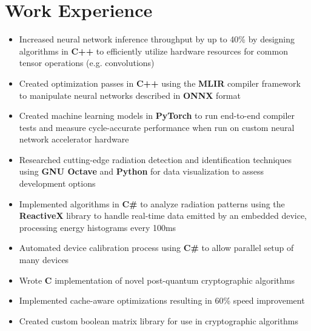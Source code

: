 \documentclass{moderncv}
\begin{document}
\makecvtitle
\section{Work Experience}
{\begin{itemize}
    \item Increased neural network inference throughput by up to 40\% by designing algorithms in \textbf{C++} to efficiently utilize hardware resources for common tensor operations (e.g. convolutions)
    \item Created optimization passes in \textbf{C++} using the \textbf{MLIR} compiler framework to manipulate neural networks described in \textbf{ONNX} format
    \item Created machine learning models in \textbf{PyTorch} to run end-to-end compiler tests and measure cycle-accurate performance when run on custom neural network accelerator hardware
\end{itemize}}

{\begin{itemize}
    \item Researched cutting-edge radiation detection and identification techniques using \textbf{GNU Octave} and \textbf{Python} for data visualization to assess development options
    \item Implemented algorithms in \textbf{C\#} to analyze radiation patterns using the \textbf{ReactiveX} library to handle real-time data emitted by an embedded device, processing energy histograms every 100ms
    \item Automated device calibration process using \textbf{C\#} to allow parallel setup of many devices
\end{itemize}}

{\begin{itemize}
    \item Wrote \textbf{C} implementation of novel post-quantum cryptographic algorithms
    \item Implemented cache-aware optimizations resulting in 60\% speed improvement
    \item Created custom boolean matrix library for use in cryptographic algorithms
\end{itemize}}
\end{document}

